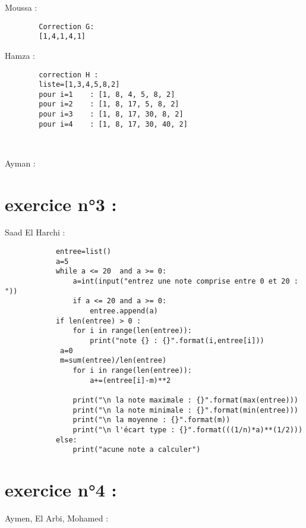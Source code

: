 \documentclass{article}
\begin{document}
    	\begin{center}
    		Moussa :
	\end{center} 
	
	\begin{verbatim}
		Correction G:
		[1,4,1,4,1]
	\end{verbatim}

    	\begin{center}
    		Hamza :
	\end{center}
	\begin{verbatim}
		correction H :
		liste=[1,3,4,5,8,2]
		pour i=1    : [1, 8, 4, 5, 8, 2]
		pour i=2    : [1, 8, 17, 5, 8, 2]
		pour i=3    : [1, 8, 17, 30, 8, 2]
		pour i=4    : [1, 8, 17, 30, 40, 2]
		
	
	\end{verbatim}
	


	\begin{center}
    		Ayman :
	\end{center} 
	
\section{exercice n°3 :}
        \begin{center}
    		Saad El Harchi :
	\end{center}    	  
        	
    	\begin{verbatim}
			entree=list()
			a=5
			while a <= 20  and a >= 0:
    			a=int(input("entrez une note comprise entre 0 et 20 : "))
    			if a <= 20 and a >= 0:
        			entree.append(a) 
			if len(entree) > 0 :
    			for i in range(len(entree)):
        			print("note {} : {}".format(i,entree[i]))
   			 a=0
   			 m=sum(entree)/len(entree)
    			for i in range(len(entree)):
        			a+=(entree[i]-m)**2
    
    			print("\n la note maximale : {}".format(max(entree)))
    			print("\n la note minimale : {}".format(min(entree)))
    			print("\n la moyenne : {}".format(m))
    			print("\n l'écart type : {}".format(((1/n)*a)**(1/2)))
			else:
    			print("acune note a calculer")
		\end{verbatim}

\section{exercice n°4 :}
	\begin{center}
    		Aymen, El Arbi, Mohamed :
	\end{center}
	\begin{verbatim}
		
	\end{verbatim}
\end{document}
